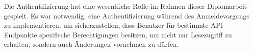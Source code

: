 Die Authentifizierung hat eine wesentliche Rolle im Rahmen dieser Diplomarbeit gespielt. Es war notwendig, eine Authentifizierung während des Anmeldevorgangs zu implementieren, um sicherzustellen, dass Benutzer für bestimmte API-Endpunkte spezifische Berechtigungen besitzen, um nicht nur Lesezugriff zu erhalten, sondern auch Änderungen vornehmen zu dürfen.
